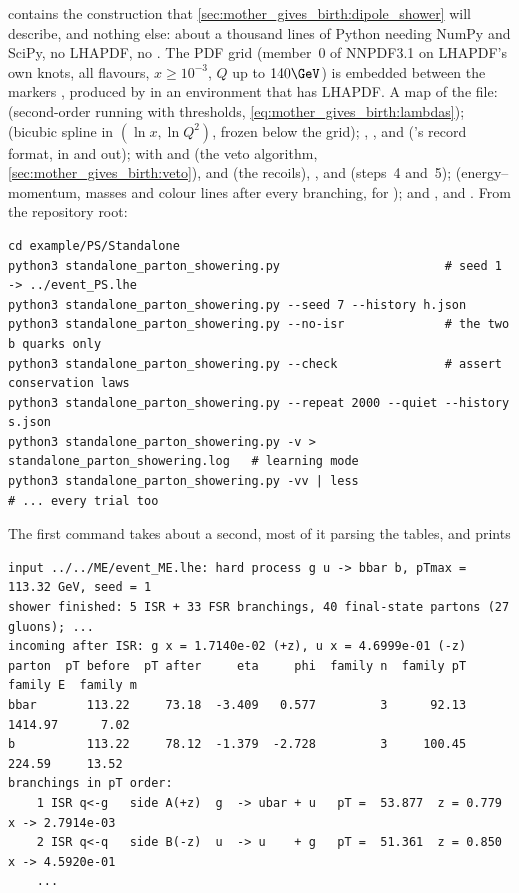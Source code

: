  contains the
construction that \cref{sec:mother_gives_birth:dipole_shower} will describe,
and nothing else: about a thousand lines of Python needing NumPy and SciPy, no LHAPDF,
no \PYTHIA. The PDF grid (member~0 of NNPDF3.1 on LHAPDF's own knots, all
flavours, $x\ge10^{-3}$, $Q$ up to $140\GeV$) is embedded between the markers
, produced by 
in an environment that has LHAPDF. A map of the file: 
(second-order running with thresholds, \cref{eq:mother_gives_birth:lambdas});
 (bicubic spline in $(\ln x,\ln Q^2)$, frozen below the
grid); , ,  and 
(\PYTHIA's record format, in and out);  with
 and  (the veto algorithm,
\cref{sec:mother_gives_birth:veto}),  and
 (the recoils), , 
and  (steps~4 and~5);  (energy--momentum, masses and
colour lines after every branching, for ); and
,  and . From the repository root:
\begin{verbatim}
cd example/PS/Standalone
python3 standalone_parton_showering.py                       # seed 1 -> ../event_PS.lhe
python3 standalone_parton_showering.py --seed 7 --history h.json
python3 standalone_parton_showering.py --no-isr              # the two b quarks only
python3 standalone_parton_showering.py --check               # assert conservation laws
python3 standalone_parton_showering.py --repeat 2000 --quiet --history s.json
python3 standalone_parton_showering.py -v > standalone_parton_showering.log   # learning mode
python3 standalone_parton_showering.py -vv | less                             # ... every trial too
\end{verbatim}
The first command takes about a second, most of it parsing the tables, and
prints
\begin{verbatim}
input ../../ME/event_ME.lhe: hard process g u -> bbar b, pTmax = 113.32 GeV, seed = 1
shower finished: 5 ISR + 33 FSR branchings, 40 final-state partons (27 gluons); ...
incoming after ISR: g x = 1.7140e-02 (+z), u x = 4.6999e-01 (-z)
parton  pT before  pT after     eta     phi  family n  family pT  family E  family m
bbar       113.22     73.18  -3.409   0.577         3      92.13   1414.97      7.02
b          113.22     78.12  -1.379  -2.728         3     100.45    224.59     13.52
branchings in pT order:
    1 ISR q<-g   side A(+z)  g  -> ubar + u   pT =  53.877  z = 0.779  x -> 2.7914e-03
    2 ISR q<-q   side B(-z)  u  -> u    + g   pT =  51.361  z = 0.850  x -> 4.5920e-01
    ...
\end{verbatim}
